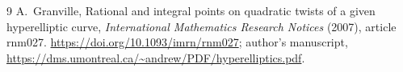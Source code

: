 \documentclass[11pt,a4paper]{article}
\begin{document}
\begin{thebibliography}{9}
A.~Granville, Rational and integral points on quadratic twists
of a given hyperelliptic curve, \emph{International Mathematics
Research Notices} (2007), article rnm027.
\url{https://doi.org/10.1093/imrn/rnm027}; author's manuscript,
\url{https://dms.umontreal.ca/~andrew/PDF/hyperelliptics.pdf}.
\end{thebibliography}
\end{document}
